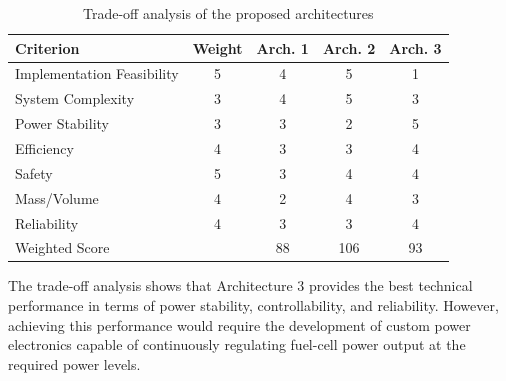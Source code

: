 \begin{table}[htp]
    \centering
    \begin{tabular}{lcccc}
        \toprule
        \textbf{Criterion}         & \textbf{Weight} & \textbf{Arch. 1} & \textbf{Arch. 2} & \textbf{Arch. 3} \\
        \midrule
        Implementation Feasibility & 5               & 4                & 5                & 1                \\
        System Complexity          & 3               & 4                & 5                & 3                \\
        Power Stability            & 3               & 3                & 2                & 5                \\
        Efficiency                 & 4               & 3                & 3                & 4                \\
        Safety                     & 5               & 3                & 4                & 4                \\
        Mass/Volume                & 4               & 2                & 4                & 3                \\
        Reliability                & 4               & 3                & 3                & 4                \\
        \midrule
        Weighted Score             &                 & 88               & 106              & 93               \\
        \bottomrule
    \end{tabular}
    \caption{Trade-off analysis of the proposed architectures}
    \label{tab:tradeoff}
\end{table}



The trade-off analysis shows that Architecture 3 provides the best technical performance in terms of power stability, controllability, and reliability. However, achieving this performance would require the development of custom power electronics capable of continuously regulating fuel-cell power output at the required power levels.

